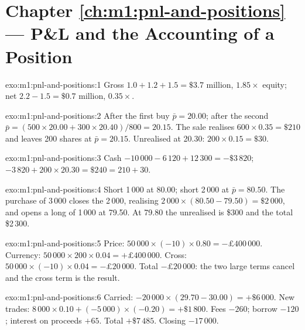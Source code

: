 \section*{Chapter \ref{ch:m1:pnl-and-positions} --- P\&L and the Accounting of a Position}

\begin{solution}{exo:m1:pnl-and-positions:1}
Gross $1.0 + 1.2 + 1.5 = \$3.7$ million, $1.85\times$ equity; net $2.2 - 1.5
= \$0.7$ million, $0.35\times$.
\end{solution}

\begin{solution}{exo:m1:pnl-and-positions:2}
After the first buy $\bar p = 20.00$; after the second $\bar p =
(500\times20.00 + 300\times20.40)/800 = 20.15$. The sale realises $600\times
0.35 = \$210$ and leaves 200 shares at $\bar p = 20.15$. Unrealised at 20.30:
$200 \times 0.15 = \$30$.
\end{solution}

\begin{solution}{exo:m1:pnl-and-positions:3}
Cash $-10\,000 - 6\,120 + 12\,300 = -\$3\,820$; $-3\,820 + 200\times20.30 =
\$240 = 210 + 30$.
\end{solution}

\begin{solution}{exo:m1:pnl-and-positions:4}
Short 1\,000 at 80.00; short 2\,000 at $\bar p = 80.50$. The purchase of
3\,000 closes the 2\,000, realising $2\,000\times(80.50-79.50) = \$2\,000$,
and opens a long of 1\,000 at 79.50. At 79.80 the unrealised is \$300 and the
total \$2\,300.
\end{solution}

\begin{solution}{exo:m1:pnl-and-positions:5}
Price: $50\,000\times(-10)\times0.80 = -\pounds400\,000$. Currency:
$50\,000\times200\times0.04 = +\pounds400\,000$. Cross:
$50\,000\times(-10)\times0.04 = -\pounds20\,000$. Total $-\pounds20\,000$:
the two large terms cancel and the cross term is the result.
\end{solution}

\begin{solution}{exo:m1:pnl-and-positions:6}
Carried: $-20\,000\times(29.70-30.00) = +\$6\,000$. New trades:
$8\,000\times0.10 + (-5\,000)\times(-0.20) = +\$1\,800$. Fees $-260$; borrow
$-120$; interest on proceeds $+65$. Total $+\$7\,485$. Closing 
$-17\,000$.
\end{solution}


